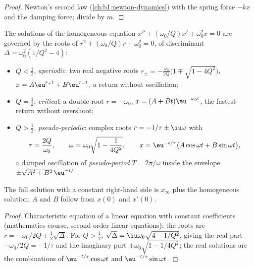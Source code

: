 \begin{proof}
Newton's second law (\cref{ch:b1:newton-dynamics}) with the spring force
$-kx$ and the damping force; divide by $m$.
\end{proof}

\begin{theorem}\label{thm:b1:transient-regimes:regimes}
The solutions of the homogeneous equation $x'' + (\omega_0/Q)x' +
\omega_0^2 x = 0$ are governed by the roots of $r^2 + (\omega_0/Q)r +
\omega_0^2 = 0$, of discriminant $\Delta = \omega_0^2(1/Q^2 - 4)$:
\begin{itemize}
  \item $Q < \tfrac12$, \emph{aperiodic}: two real negative roots
        $r_\pm = -\frac{\omega_0}{2Q}\big(1 \mp \sqrt{1 - 4Q^2}\big)$,
        $x = A\eu^{r_+t} + B\eu^{r_-t}$, a return without oscillation;
  \item $Q = \tfrac12$, \emph{critical}: a double root $r = -\omega_0$,
        $x = (A + Bt)\eu^{-\omega_0 t}$, the fastest return without
        overshoot;
  \item $Q > \tfrac12$, \emph{pseudo-periodic}: complex roots
        $r = -1/\tau \pm \iu\omega$ with
        \[
        \tau = \frac{2Q}{\omega_0}, \qquad
        \omega = \omega_0\sqrt{1 - \frac{1}{4Q^2}},
        \qquad
        x = \eu^{-t/\tau}\big(A\cos\omega t + B\sin\omega t\big),
        \]
        a damped oscillation of \emph{pseudo-period} $T = 2\pi/\omega$
        inside the envelope $\pm\sqrt{A^2 + B^2}\,\eu^{-t/\tau}$.
\end{itemize}
The full solution with a constant right-hand side is $x_\infty$ plus the
homogeneous solution; $A$ and $B$ follow from $x(0)$ and $x'(0)$.
\end{theorem}

\begin{proof}
Characteristic equation of a linear equation with constant
coefficients (mathematics course, second-order linear equations): the
roots are $r = -\omega_0/2Q \pm \tfrac12\sqrt\Delta$. For $Q > \tfrac12$,
$\sqrt\Delta = \iu\omega_0\sqrt{4 - 1/Q^2}$, giving the real part
$-\omega_0/2Q = -1/\tau$ and the imaginary part $\pm\omega_0\sqrt{1 - 1/4Q^2}$;
the real solutions are the combinations of $\eu^{-t/\tau}\cos\omega t$
and $\eu^{-t/\tau}\sin\omega t$.
\end{proof}

